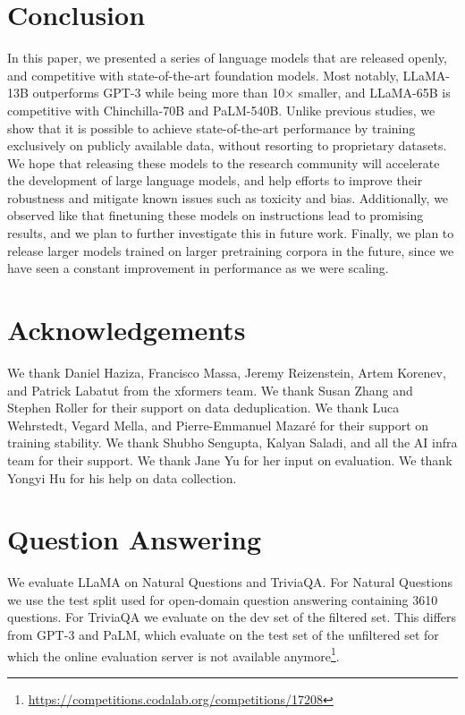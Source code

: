 \documentclass[11pt]{article}
\newcommand{\model}{LLaMA\xspace}
\begin{document}
\section{Conclusion}

 In this paper, we presented a series of language models that are released openly, and competitive with state-of-the-art foundation models. Most notably, \model-13B outperforms GPT-3 while being more than 10$\times$ smaller, and \model-65B is competitive with Chinchilla-70B and PaLM-540B. Unlike previous studies, we show that it is possible to achieve state-of-the-art performance by training exclusively on publicly available data, without resorting to proprietary datasets.
We hope that releasing these models to the research community will accelerate the development of large language models, and help efforts to improve their robustness and mitigate known issues such as toxicity and bias.
Additionally, we observed like \citet{Chung2022ScalingIL} that finetuning these models on instructions lead to promising results, and we plan to further investigate this in future work.
Finally, we plan to release larger models trained on larger pretraining corpora in the future, since we have seen a constant improvement in performance as we were scaling.

\section*{Acknowledgements}
 We thank Daniel Haziza, Francisco Massa, Jeremy Reizenstein, Artem Korenev, and Patrick Labatut from the xformers team.
We thank Susan Zhang and Stephen Roller for their support on data deduplication.
We thank Luca Wehrstedt, Vegard Mella, and Pierre-Emmanuel Mazaré for their support on training stability.
We thank Shubho Sengupta, Kalyan Saladi, and all the AI infra team for their support.
We thank Jane Yu for her input on evaluation.
We thank Yongyi Hu for his help on data collection.




\clearpage
\appendix
\onecolumn
{}  

\section{Question Answering}
We evaluate \model on Natural Questions and TriviaQA.
For Natural Questions we use the test split used for open-domain question answering containing 3610 questions.
For TriviaQA we evaluate on the dev set of the filtered set.
This differs from GPT-3 and PaLM, which evaluate on the test set of the unfiltered set for which the online evaluation server is not available anymore\footnote{\url{https://competitions.codalab.org/competitions/17208}}.
\end{document}
